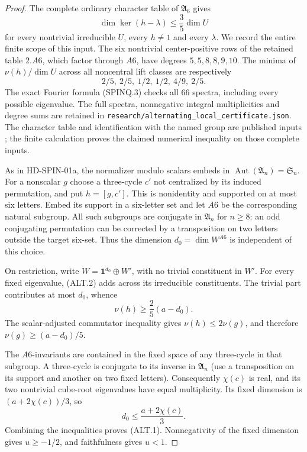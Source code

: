 \begin{proof}
The complete ordinary character table of $\mathfrak A_6$ gives
\[
       \dim\ker(h-\lambda)\le\frac35\dim U              \tag{ALT.2}
\]
for every nontrivial irreducible $U$, every $h\ne1$ and every
$\lambda$.  We record the entire finite scope of this input.
The six nontrivial center-positive rows of the retained table
$2.A6$, which factor through $A6$, have degrees
$5,5,8,8,9,10$.  The minima of $\nu(h)/\dim U$ across all
noncentral lift classes are respectively
\[
                   2/5,\ 2/5,\ 1/2,\ 1/2,\ 4/9,\ 2/5.
                                                               \tag{ALT.3}
\]
The exact Fourier formula (SPINQ.3) checks all $66$ spectra,
including every possible eigenvalue.  The full spectra,
nonnegative integral multiplicities and degree sums are retained
in \texttt{research/alternating\_local\_certificate.json}.
The character table and identification with the named group
are published inputs \cite{SPOR:CTblLib}; the finite calculation
proves the claimed numerical inequality on those complete inputs.

As in HD-SPIN-01a, the normalizer modulo scalars embeds in
$\operatorname{Aut}(\mathfrak A_n)=\mathfrak S_n$.
For a nonscalar $g$ choose a three-cycle $c'$ not centralized by
its induced permutation, and put $h=[g,c']$.  This is nonidentity
and supported on at most six letters.  Embed its support in a
six-letter set and let $A6$ be the corresponding natural subgroup.
All such subgroups are conjugate in $\mathfrak A_n$ for $n\ge8$:
an odd conjugating permutation can be corrected by a transposition
on two letters outside the target six-set.  Thus the dimension
$d_0=\dim W^{A6}$ is independent of this choice.

On restriction, write $W=\mathbf1^{d_0}\oplus W'$, with no
trivial constituent in $W'$.  For every fixed eigenvalue,
(ALT.2) adds across its irreducible constituents.  The trivial
part contributes at most $d_0$, whence
\[
                    \nu(h)\ge\frac25(a-d_0).
\]
The scalar-adjusted commutator inequality gives
$\nu(h)\le2\nu(g)$, and therefore
$\nu(g)\ge(a-d_0)/5$.

The $A6$-invariants are contained in the fixed space of any
three-cycle in that subgroup.  A three-cycle is conjugate to
its inverse in $\mathfrak A_n$ (use a transposition on its
support and another on two fixed letters).  Consequently
$\chi(c)$ is real, and its two nontrivial cube-root eigenvalues
have equal multiplicity.  Its fixed dimension is
$(a+2\chi(c))/3$, so
\[
              d_0\le\frac{a+2\chi(c)}3.
\]
Combining the inequalities proves (ALT.1).  Nonnegativity of the
fixed dimension gives $u\ge-1/2$, and faithfulness gives $u<1$.
\end{proof}

